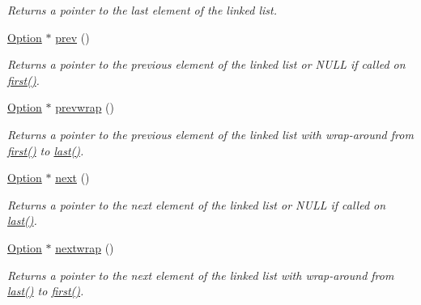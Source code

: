 \begin{DoxyCompactItemize}
\begin{DoxyCompactList}\small\item\em Returns a pointer to the last element of the linked list. \end{DoxyCompactList}\item 
\hyperlink{classxmem_1_1config_1_1third__party_1_1_option}{Option} $\ast$ \hyperlink{classxmem_1_1config_1_1third__party_1_1_option_a51c55046e8f111be3e329f798d0f72b9}{prev} ()
\begin{DoxyCompactList}\small\item\em Returns a pointer to the previous element of the linked list or N\+U\+L\+L if called on \hyperlink{classxmem_1_1config_1_1third__party_1_1_option_a6c8907c4faaf8c099d556db54bfca1a5}{first()}. \end{DoxyCompactList}\item 
\hyperlink{classxmem_1_1config_1_1third__party_1_1_option}{Option} $\ast$ \hyperlink{classxmem_1_1config_1_1third__party_1_1_option_a66a85758180b4b833dfd6574ba1a2246}{prevwrap} ()
\begin{DoxyCompactList}\small\item\em Returns a pointer to the previous element of the linked list with wrap-\/around from \hyperlink{classxmem_1_1config_1_1third__party_1_1_option_a6c8907c4faaf8c099d556db54bfca1a5}{first()} to \hyperlink{classxmem_1_1config_1_1third__party_1_1_option_a79bd212eaf002df298da1b3b46e34cea}{last()}. \end{DoxyCompactList}\item 
\hyperlink{classxmem_1_1config_1_1third__party_1_1_option}{Option} $\ast$ \hyperlink{classxmem_1_1config_1_1third__party_1_1_option_af9c5d2de03863bbcdc05a1d6771f1f36}{next} ()
\begin{DoxyCompactList}\small\item\em Returns a pointer to the next element of the linked list or N\+U\+L\+L if called on \hyperlink{classxmem_1_1config_1_1third__party_1_1_option_a79bd212eaf002df298da1b3b46e34cea}{last()}. \end{DoxyCompactList}\item 
\hyperlink{classxmem_1_1config_1_1third__party_1_1_option}{Option} $\ast$ \hyperlink{classxmem_1_1config_1_1third__party_1_1_option_ae4da74e185cee05d6e3eeda723b39b50}{nextwrap} ()
\begin{DoxyCompactList}\small\item\em Returns a pointer to the next element of the linked list with wrap-\/around from \hyperlink{classxmem_1_1config_1_1third__party_1_1_option_a79bd212eaf002df298da1b3b46e34cea}{last()} to \hyperlink{classxmem_1_1config_1_1third__party_1_1_option_a6c8907c4faaf8c099d556db54bfca1a5}{first()}. \end{DoxyCompactList}\item 

\end{DoxyCompactItemize}
